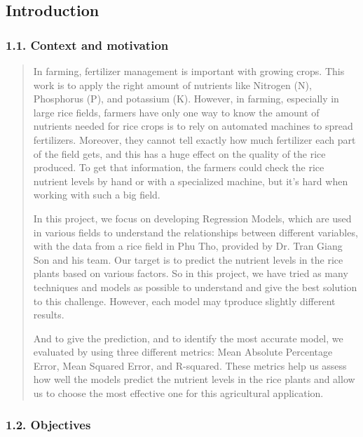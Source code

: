 \documentclass[
]{article}
\begin{document}
\hypertarget{introduction}{%
\subsection{\texorpdfstring{\textbf{Introduction}}{Introduction}}\label{introduction}}

\hypertarget{context-and-motivation}{%
\subsubsection{\texorpdfstring{\textbf{1.1. Context and
motivation}}{1.1. Context and motivation}}\label{context-and-motivation}}

\begin{quote}
In farming, fertilizer management is important with growing crops. This
work is to apply the right amount of nutrients like Nitrogen (N),
Phosphorus (P), and potassium (K). However, in farming, especially in
large rice fields, farmers have only one way to know the amount of
nutrients needed for rice crops is to rely on automated machines to
spread fertilizers. Moreover, they cannot tell exactly how much
fertilizer each part of the field gets, and this has a huge effect on
the quality of the rice produced. To get that information, the farmers
could check the rice nutrient levels by hand or with a specialized
machine, but it's hard when working with such a big field.

In this project, we focus on developing Regression Models, which are
used in various fields to understand the relationships between different
variables, with the data from a rice field in Phu Tho, provided by Dr.
Tran Giang Son and his team. Our target is to predict the nutrient
levels in the rice plants based on various factors. So in this project,
we have tried as many techniques and models as possible to understand
and give the best solution to this challenge. However, each model may
tproduce slightly different results.

And to give the prediction, and to identify the most accurate model, we
evaluated by using three different metrics: Mean Absolute Percentage
Error, Mean Squared Error, and R-squared. These metrics help us assess
how well the models predict the nutrient levels in the rice plants and
allow us to choose the most effective one for this agricultural
application.
\end{quote}

\hypertarget{objectives}{%
\subsubsection{\texorpdfstring{ \textbf{1.2.
Objectives}}{ 1.2. Objectives}}\label{objectives}}
\end{document}
